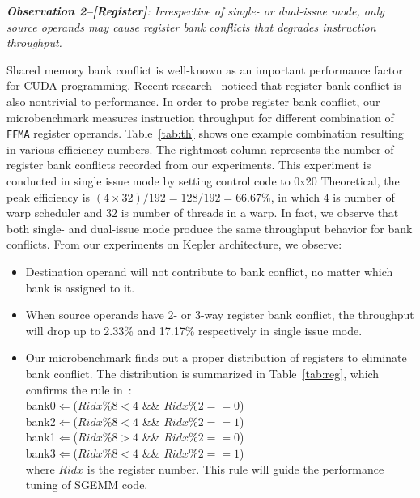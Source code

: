 {\em {\bf Observation 2--[Register]}: 
Irrespective of single- or dual-issue mode, only source operands may cause register bank conflicts that degrades instruction throughput.}

Shared memory bank conflict is well-known as an important performance factor for CUDA programming.
Recent research~\cite{lai} noticed that register bank conflict is also nontrivial to performance. 
In order to probe 
register bank conflict, our microbenchmark measures instruction throughput for different combination of {\tt FFMA} 
register operands. 
Table~\ref{tab:th} shows one example combination resulting in various efficiency numbers. 
The rightmost column represents the number of register bank conflicts recorded from our experiments. 
This experiment is conducted 
in single issue mode by setting control code to 0x20 %
Theoretical, the peak efficiency is $(4\times32)/192=128/192=66.67\%$, in which $4$ is number of warp scheduler and $32$
is number of threads in a warp.%
In fact, we observe that both single- and dual-issue mode produce the same throughput behavior for bank conflicts.
From our experiments on Kepler architecture, we observe:
\begin{itemize}
\item Destination operand will not contribute to bank conflict, no matter which bank is assigned to it.
\item When source operands have 2- or 3-way register bank conflict, the throughput will drop up to 2.33\% and 17.17\% respectively in single issue mode. 
\item Our microbenchmark finds out a proper distribution of registers to eliminate bank
     conflict. 
     The distribution is summarized in Table~\ref{tab:reg}, which confirms the rule in~\cite{lai}: \\
 bank0$\Leftarrow$($Ridx \% 8 < 4$ \&\& $Ridx \% 2 == 0$) \\
 bank2$\Leftarrow$($Ridx \% 8 < 4$ \&\& $Ridx \% 2 == 1$) \\
bank1$\Leftarrow$($Ridx \% 8 > 4$ \&\& $Ridx \%2 == 0$) \\
bank3$\Leftarrow$($Ridx \% 8 < 4$ \&\& $Ridx\% 2 == 1$)\\
where $Ridx$ is the register number. 
This rule will guide the performance tuning of SGEMM code.

\end{itemize}


